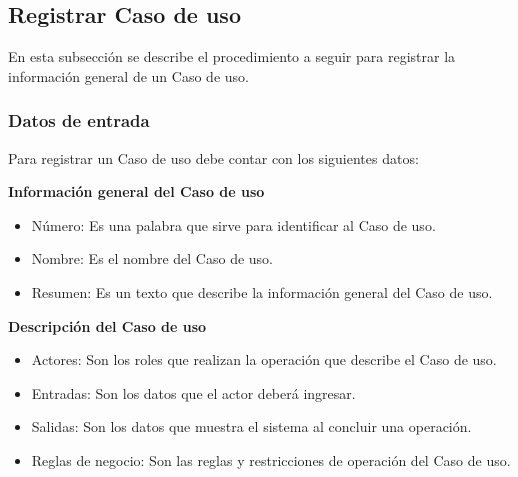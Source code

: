 \subsection{Registrar Caso de uso}
En esta subsección se describe el procedimiento a seguir para registrar la información general de un Caso de uso.

\subsubsection{Datos de entrada}
\begin{description}
	\item Para registrar un Caso de uso debe contar con los siguientes datos: \hspace{10pt}
	
	\begin{description}
	    \item \textbf{Información general del Caso de uso}
	    \begin{itemize}
		  \item Número: Es una palabra que sirve para identificar al Caso de uso.
		  \item Nombre: Es el nombre del Caso de uso.
		  \item Resumen: Es un texto que describe la información general del Caso de uso.
	    \end{itemize}
	    \item \textbf{Descripción del Caso de uso}
	    \begin{itemize}
		  \item Actores: Son los roles que realizan la operación que describe el Caso de uso.
		  \item Entradas: Son los datos que el actor deberá ingresar.
		  \item Salidas: Son los datos que muestra el sistema al concluir una operación.
		  \item Reglas de negocio: Son las reglas y restricciones de operación del Caso de uso.
	    \end{itemize}
	 \end{description}
\end{description}

